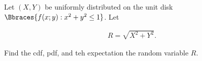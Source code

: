 
\begin{exercise}

Let $(X, Y)$ be uniformly distributed on the unit disk $\Bbraces{f(x; y): x^2 + y^2 \leq 1}$.
Let

\begin{align*}
    R = \sqrt{X^2 + Y^2}.
\end{align*}

Find the cdf, pdf, and teh expectation the random variable $R$.

\end{exercise}


